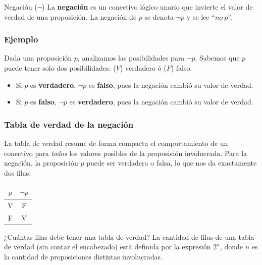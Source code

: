 \begin{dfn}{Negación ($\lnot$)}
    La \textbf{negación} es un conectivo lógico unario que invierte el valor de verdad de una proposición. La negación de $p$ se denota $\lnot p$ y se lee ``$no\ p$''.
\end{dfn}

\subsubsection*{Ejemplo}
Dada una proposición $p$, analizamos las posibilidades para $\lnot p$. Sabemos que $p$ puede tener solo dos posibilidades: ($V$) verdadero ó ($F$) falso.
\begin{itemize}
    \item Si $p$ es \textbf{verdadero}, $\lnot p$ es \textbf{falso}, pues la negación cambió su valor de verdad.
    \item Si $p$ es \textbf{falso}, $\lnot p$ es \textbf{verdadero}, pues la negación cambió su valor de verdad.
\end{itemize}

\subsubsection*{Tabla de verdad de la negación}

\noindent La tabla de verdad resume de forma compacta el comportamiento de un conectivo para \emph{todos} los valores posibles de la proposición involucrada. Para la negación, la proposición $p$ puede ser verdadera o falsa, lo que nos da exactamente dos filas:

\begin{center}
    \renewcommand{\arraystretch}{1.4}
    \begin{tabular}{|c|c|}
        \hline
        $p$ & $\lnot p$ \\
        \hline
        V & F \\
        \hline
        F & V \\
        \hline
    \end{tabular}
\end{center}

\begin{obs}{¿Cuántas filas debe tener una tabla de verdad?}
    La cantidad de filas de una tabla de verdad (sin contar el encabezado) está definida por la expresión $2^{n}$, donde $n$ es la cantidad de proposiciones distintas involucradas.
\end{obs}

